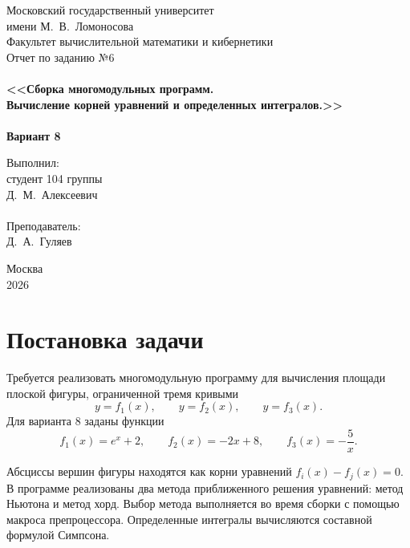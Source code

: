 \documentclass[a4paper,12pt,titlepage,finall]{article}
\begin{document}
\begin{titlepage}
    \begin{center}
    {\small \sc Московский государственный университет \\имени М.~В.~Ломоносова\\
    Факультет вычислительной математики и кибернетики\\}
    \vfill
    {\Large \sc Отчет по заданию №6}\\
    ~\\
    {\large \bf <<Сборка многомодульных программ. \\
    Вычисление корней уравнений и определенных интегралов.>>}\\
    ~\\
    {\large \bf Вариант 8}
    \end{center}
    \begin{flushright}
    \vfill {Выполнил:\\
    студент 104 группы\\
    Д.~М.~Алексеевич\\
    ~\\
    Преподаватель:\\
    Д.~А.~Гуляев
    }
    \end{flushright}
    \begin{center}
    \vfill
    {\small Москва\\2026}
    \end{center}
\end{titlepage}

\tableofcontents
\newpage

\section{Постановка задачи}

Требуется реализовать многомодульную программу для вычисления площади
плоской фигуры, ограниченной тремя кривыми
\[
    y=f_1(x),\qquad y=f_2(x),\qquad y=f_3(x).
\]
Для варианта 8 заданы функции
\[
    f_1(x)=e^x+2,\qquad
    f_2(x)=-2x+8,\qquad
    f_3(x)=-\frac{5}{x}.
\]

Абсциссы вершин фигуры находятся как корни уравнений $f_i(x)-f_j(x)=0$.
В программе реализованы два метода приближенного решения уравнений:
метод Ньютона и метод хорд. Выбор метода выполняется во время сборки
с помощью макроса препроцессора. Определенные интегралы вычисляются
составной формулой Симпсона.
\end{document}
